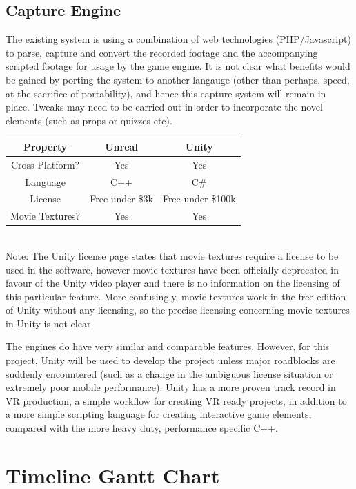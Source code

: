 \documentclass[11pt]{report}
\begin{document}
\section{Capture Engine}
The existing system is using a combination of web technologies (PHP/Javascript) to parse, capture and convert the recorded footage and the accompanying scripted footage for usage by the game engine. It is not clear what benefits would be gained by porting the system to another langauge (other than perhaps, speed, at the sacrifice of portability), and hence this capture system will remain in place. Tweaks may need to be carried out in order to incorporate the novel elements (such as props or quizzes etc).
\begin{center}
\begin{tabular}{||c c c||} 
\hline
Property & Unreal & Unity \\ [0.5ex] 
\hline\hline
Cross Platform? & Yes & Yes \\ 
\hline
Language& C++ & C\# \\
\hline
License & Free under \$3k & Free under \$100k \* \\
\hline
Movie Textures? &Yes & Yes \\
\hline
\end{tabular}\\
\* Note: The Unity license page states that movie textures require a license to be used in the software, however movie textures have been officially deprecated in favour of the Unity video player and there is no information on the licensing of this particular feature. More confusingly, movie textures work in the free edition of Unity without any licensing, so the precise licensing concerning movie textures in Unity is not clear.
\end{center}
The engines do have very similar and comparable features. However, for this project, Unity will be used to develop the project unless major roadblocks are suddenly encountered (such as a change in the ambiguous license situation or extremely poor mobile performance). Unity has a more proven track record in VR production, a simple workflow for creating VR ready projects, in addition to a more simple scripting language for creating interactive game elements, compared with the more heavy duty, performance specific C++.


\appendix
\chapter{Timeline Gantt Chart}

\end{document}
